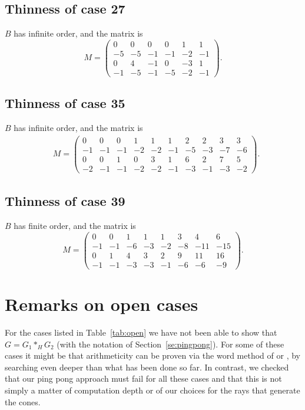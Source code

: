 \documentclass[11pt,a4paper]{amsart}
\theoremstyle{definition}
\theoremstyle{definition}
\numberwithin{equation}{section}
\begin{document}
\subsection{Thinness of case 27}
$B$ has infinite order, and the matrix is
$$ M=\left(\begin{array}{rrrrrr}
0 & 0 & 0 & 0 & 1 & 1 \\
-5 & -5 & -1 & -1 & -2 & -1 \\
0 & 4 & -1 & 0 & -3 & 1 \\
-1 & -5 & -1 & -5 & -2 & -1
\end{array}\right).$$

\subsection{Thinness of case 35}
$B$ has infinite order, and the matrix is
\begin{align*}
&M=\left(\begin{array}{rrrrrrrrrr}
0 & 0 & 0 & 1 & 1 & 1 & 2 & 2 & 3 & 3 \\
-1 & -1 & -1 & -2 & -2 & -1 & -5 & -3 & -7 & -6 \\
0 & 0 & 1 & 0 & 3 & 1 & 6 & 2 & 7 & 5 \\
-2 & -1 & -1 & -2 & -2 & -1 & -3 & -1 & -3 & -2
\end{array}\right).
\end{align*}

\subsection{Thinness of case 39}
$B$ has finite order, and the matrix is
$$ M=\left(\begin{array}{rrrrrrrrrr}
0 & 0 & 1 & 1 & 1 & 3 & 4 & 6 \\
-1 & -1 & -6 & -3 & -2 & -8 & -11 & -15 \\
0 & 1 & 4 & 3 & 2 & 9 & 11 & 16 \\
-1 & -1 & -3 & -3 & -1 & -6 & -6 & -9
\end{array}\right).$$


\section{Remarks on open cases}\label{se:open}
For the cases listed in Table~\ref{tab:open} we have not been able to show that $G=G_1\ast_{H} G_2$ (with the notation of Section~\ref{se:pingpong}). For some of these cases it might be that arithmeticity can be proven via the word method of \cite{bdss} or \cite{BDN22}, by searching even deeper than what has been done so far. In contrast, we checked that our ping pong approach must fail for all these cases and that this is not simply a matter of computation depth or of our choices for the rays that generate the cones.
\end{document}
